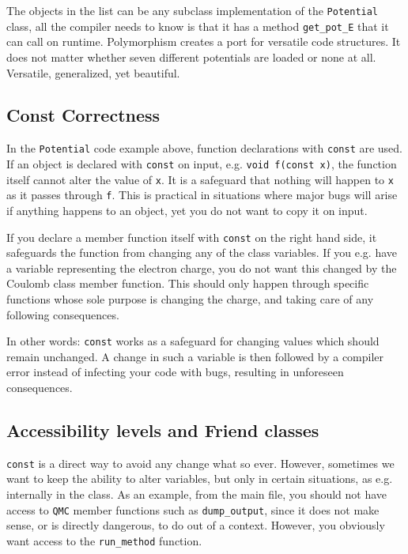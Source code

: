 The objects in the list can be any subclass implementation of the \verb+Potential+ class, all the compiler needs to know is that it has a method \verb+get_pot_E+ that it can call on runtime. Polymorphism creates a port for versatile code structures. It does not matter whether seven different potentials are loaded or none at all. Versatile, generalized, yet beautiful. 

\subsection{Const Correctness}

In the \verb+Potential+ code example above, function declarations with \verb+const+ are used. If an object is declared with \verb+const+ on input, e.g. \verb+void f(const x)+, the function itself cannot alter the value of \verb+x+. It is a safeguard that nothing will happen to \verb+x+ as it passes through \verb+f+. This is practical in situations where major bugs will arise if anything happens to an object, yet you do not want to copy it on input.

If you declare a member function itself with \verb+const+ on the right hand side, it safeguards the function from changing any of the class variables. If you e.g. have a variable representing the electron charge, you do not want this changed by the Coulomb class member function. This should only happen through specific functions whose sole purpose is changing the charge, and taking care of any following consequences. 

In other words: \verb+const+ works as a safeguard for changing values which should remain unchanged. A change in such a variable is then followed by a compiler error instead of infecting your code with bugs, resulting in unforeseen consequences.

\subsection{Accessibility levels and Friend classes}

\verb+const+ is a direct way to avoid any change what so ever. However, sometimes we want to keep the ability to alter variables, but only in certain situations, as e.g. internally in the class. As an example, from the main file, you should not have access to \verb+QMC+ member functions such as \verb+dump_output+, since it does not make sense, or is directly dangerous, to do out of a context. However, you obviously want access to the \verb+run_method+ function.

